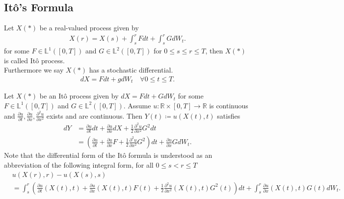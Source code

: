 \subsection{It\^o's Formula}
\begin{definition}[It\^o Process]
 Let $X(*)$ be a real-valued process given by 
 \begin{align*}
  X(r) = X(s) + \int_s^{r} F dt + \int_s^{r} GdW_t  
 .\end{align*}
 for some $F \in  \mathbb{L}^1([0,T])$ and $G \in  \mathbb{L}^2([0,T])$ for $0\le s\le r\le T$, then $X(*)$ is called It\^o process.\\[1ex]
 Furthermore we say $X(*)$ has a stochastic differential.
 \begin{align*}
  dX =  Fdt + gdW_t \quad \forall  0\le t\le T
 .\end{align*}
\end{definition}
\begin{theorem}[It\^o's Formula]
  Let $X(*)$  be an It\^o process given by $dX = F dt + GdW_t$ for some $F \in  \mathbb{L}^{1}([0,T]) $ and $G \in  \mathbb{L}^2([0,T])$. Assume 
  $u : \mathbb{R} \times  [0,T] \to \mathbb{R}$ is continuous and $\frac{\partial u}{\partial t} ,\frac{\partial u}{\partial x} ,\frac{\partial ^2 u}{\partial x^2} $ exists and 
  are continuous. Then $Y(t) \coloneqq  u(X(t),t)$ satisfies 
  \begin{align*}
    dY &= \frac{\partial u}{\partial t} dt + \frac{\partial u}{\partial x} dX + \frac{1}{2 }\frac{\partial ^2 u}{\partial x^2} G^2 dt\\
       &=(\frac{\partial u}{\partial t} +\frac{\partial u}{\partial x} F + \frac{1}{2} \frac{\partial ^2 u}{\partial x^2} G^2 )dt + \frac{\partial u}{\partial x} G dW_t
  .\end{align*}
  Note that the differential form of the It\^o formula is understood as an abbreviation of the following integral form, for all $0\le s < r \le T$
  \begin{align*}
    &u(X(r),r) - u(X(s),s) \\
    &= \int_s^{r}(\frac{\partial u}{\partial t}(X(t),t)+\frac{\partial u}{\partial x}(X(t),t)F(t) + \frac{1}{2}\frac{\partial ^2 u}{\partial x^2}(X(t),t)G^2(t) )dt + \int_s^{r} \frac{\partial u}{\partial x}(X(t),t) G(t)dW_t
  .\end{align*}
  \end{theorem}
